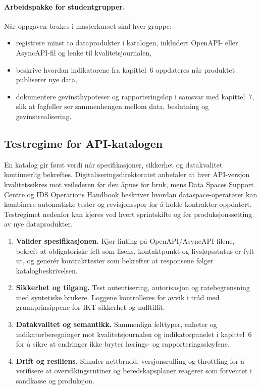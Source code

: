 \paragraph{Arbeidspakke for studentgrupper.} Når oppgaven brukes i masterkurset skal hver gruppe:
\begin{itemize}
    \item registrere minst to dataprodukter i katalogen, inkludert OpenAPI- eller AsyncAPI-fil og lenke til kvalitetsjournalen,
    \item beskrive hvordan indikatorene fra kapittel~6 oppdateres når produktet publiserer nye data,
    \item dokumentere gevinsthypoteser og rapporteringsløp i samsvar med kapittel~7, slik at fagfeller ser sammenhengen mellom
    data, beslutning og gevinstrealisering.
\end{itemize}

\subsection{Testregime for API-katalogen}
En katalog gir først verdi når spesifikasjoner, sikkerhet og datakvalitet kontinuerlig bekreftes. Digitaliseringsdirektoratet
anbefaler at hver API-versjon kvalitetssikres mot veilederen før den åpnes for bruk, mens Data Spaces Support Centre og IDS
Operations Handbook beskriver hvordan dataspace-operatører kan kombinere automatiske tester og revisjonsspor for å holde
kontrakter oppdatert.\citep{digdir2023apiveileder,dssc2024dataproducts,idsa2023operational} Testregimet nedenfor kan kjøres ved
hvert sprintskifte og før produksjonssetting av nye dataprodukter.

\begin{enumerate}
    \item \textbf{Valider spesifikasjonen.} Kjør linting på OpenAPI/AsyncAPI-filene, bekreft at obligatoriske felt som lisens,
    kontaktpunkt og livsløpsstatus er fylt ut, og generér kontrakttester som bekrefter at responsene følger katalogbeskrivelsen.
    \item \textbf{Sikkerhet og tilgang.} Test autentisering, autorisasjon og ratebegrensning med syntetiske brukere. Loggene
    kontrolleres for avvik i tråd med grunnprinsippene for IKT-sikkerhet og nulltillit.\citep{nsm2023grunnprinsipper}
    \item \textbf{Datakvalitet og semantikk.} Sammenlign felttyper, enheter og indikatorberegninger mot kvalitetsjournalen og
    indikatorpanelet i kapittel~6 for å sikre at endringer ikke bryter lærings- og rapporteringssløyfene.\citep{dssc2024dataproducts}
    \item \textbf{Drift og resiliens.} Simuler nettbrudd, versjonsrulling og throttling for å verifisere at overvåkingsrutiner og
    beredskapsplaner reagerer som forventet i sandkasse og produksjon.\citep{idsa2023operational}
\end{enumerate}

